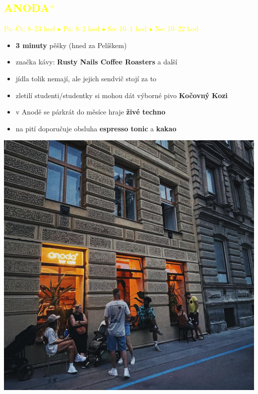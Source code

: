\documentclass[a5paper, twoside]{article}
\newcommand{\podnadpis}[2]{
  \subsection*{\textcolor{#2}{#1}}
}
\begin{document}
\noindent\begin{minipage}{0.7\textwidth}
	\podnadpis{ANODA$^+$}{yellow}
	\textcolor{yellow}{Po--Čt: 8--23 hod $\bullet$ Pá: 8--2 hod $\bullet$ So: 10--1 hod $\bullet$ Ne: 10--22 hod}
	\vspace{5pt}
	\small
	\begin{itemize}[leftmargin=10pt]
		\item \textbf{3 minuty} pěšky (hned za Pelíškem)
		\item značka kávy: \textbf{Rusty Nails Coffee Roasters} a další
		\item jídla tolik nemají, ale jejich sendvič stojí za to
		\item zletilí studenti/studentky si mohou dát výborné pivo \textbf{Kočovný Kozi}
		\item v Anodě se párkrát do měsíce hraje \textbf{živé techno}
		\item na pití doporučuje obsluha \textbf{espresso tonic} a \textbf{kakao}
	\end{itemize}
\end{minipage}
\hfill
\begin{minipage}{0.27\textwidth}
	\includegraphics[width=\linewidth]{anoda.jpg}
\end{minipage}

\vfill
\end{document}
